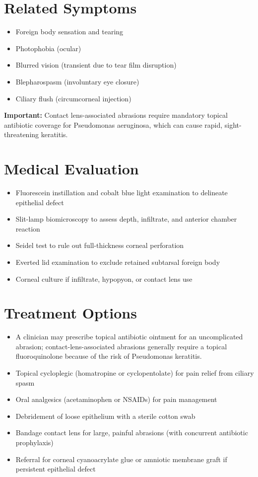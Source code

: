 \section*{Related Symptoms}
\begin{itemize}
  \item Foreign body sensation and tearing
  \item Photophobia (ocular)
  \item Blurred vision (transient due to tear film disruption)
  \item Blepharospasm (involuntary eye closure)
  \item Ciliary flush (circumcorneal injection)
\end{itemize}
\textbf{Important:} Contact lens-associated abrasions require mandatory topical antibiotic coverage for Pseudomonas aeruginosa, which can cause rapid, sight-threatening keratitis.

\section*{Medical Evaluation}
\begin{itemize}
  \item Fluorescein instillation and cobalt blue light examination to delineate epithelial defect
  \item Slit-lamp biomicroscopy to assess depth, infiltrate, and anterior chamber reaction
  \item Seidel test to rule out full-thickness corneal perforation
  \item Everted lid examination to exclude retained subtarsal foreign body
  \item Corneal culture if infiltrate, hypopyon, or contact lens use
\end{itemize}

\section*{Treatment Options}
\begin{itemize}
  \item A clinician may prescribe topical antibiotic ointment for an uncomplicated abrasion; contact-lens-associated abrasions generally require a topical fluoroquinolone because of the risk of Pseudomonas keratitis.
  \item Topical cycloplegic (homatropine or cyclopentolate) for pain relief from ciliary spasm
  \item Oral analgesics (acetaminophen or NSAIDs) for pain management
  \item Debridement of loose epithelium with a sterile cotton swab
  \item Bandage contact lens for large, painful abrasions (with concurrent antibiotic prophylaxis)
  \item Referral for corneal cyanoacrylate glue or amniotic membrane graft if persistent epithelial defect
\end{itemize}

